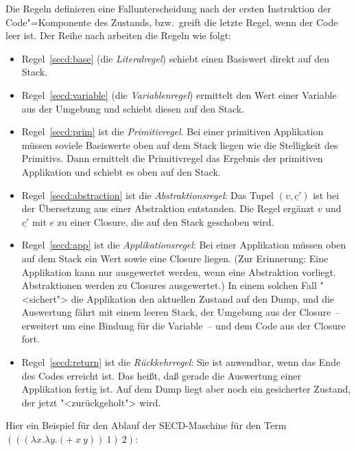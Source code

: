 %
Die Regeln definieren eine Fallunterscheidung nach der ersten
Instruktion der Code"=Komponente des Zustands, bzw.\ greift die letzte
Regel, wenn der Code leer ist.  Der Reihe nach arbeiten die Regeln wie
folgt:
%
\begin{itemize}
\item Regel~\ref{secd:base} (die
  \textit{Literalregel}) schiebt einen Basiswert
  direkt auf den Stack.
\item Regel~\ref{secd:variable} (die
  \textit{Variablenregel}) ermittelt den Wert
  einer Variable aus der Umgebung und schiebt diesen auf den Stack.
\item Regel~\ref{secd:prim} ist die
  \textit{Primitivregel}.  Bei einer primitiven
  Applikation müssen soviele Basiswerte oben auf dem Stack liegen wie
  die Stelligkeit des Primitivs.  Dann ermittelt die Primitivregel das Ergebnis der
  primitiven Applikation und schiebt es oben auf den Stack.
\item Regel~\ref{secd:abstraction} ist die
  \textit{Abstraktionsregel}: Das Tupel
  $(v,\underline{c'})$ ist bei der Übersetzung aus einer Abstraktion
  entstanden.  Die Regel ergänzt $v$ und $\underline{c'}$ mit
  $e$ zu einer Closure, die auf den Stack geschoben wird.
\item Regel~\ref{secd:app} ist die
  \textit{Applikationsregel}: Bei einer
  Applikation müssen oben auf dem Stack ein Wert sowie eine Closure
  liegen.  (Zur Erinnerung: Eine Applikation kann nur ausgewertet
  werden, wenn eine Abstraktion vorliegt.  Abstraktionen werden zu
  Closures ausgewertet.)  In einem solchen Fall "<sichert"> die
  Applikation den aktuellen Zustand auf den Dump, und die Auswertung fährt mit
  einem leeren Stack, der Umgebung aus der Closure~-- erweitert um
  eine Bindung für die Variable~-- und dem Code aus der Closure fort.
\item Regel~\ref{secd:return} ist die
  \textit{Rückkehrregel}: Sie ist anwendbar,
  wenn das Ende des Codes erreicht ist.  Das heißt, daß gerade
  die Auswertung einer Applikation fertig ist.  Auf dem Dump liegt
  aber noch ein gesicherter Zustand, der jetzt "<zurückgeholt"> wird.
\end{itemize}
%
Hier ein Beispiel für den Ablauf der SECD-Maschine für den Term
$(((\lambda x.\lambda y.(+~x~y))~1)~2)$:
%
